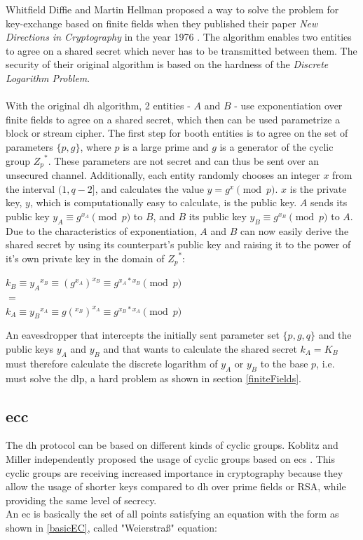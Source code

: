 Whitfield Diffie and Martin Hellman proposed a way to solve the problem for key-exchange based on finite fields
when they published their paper \textit{New Directions in Cryptography} in the year 1976 \cite{1055638}. The algorithm enables two entities to agree on a 
shared secret which never has to be transmitted between them. The security of their original algorithm
is based on the hardness of the \textit{Discrete Logarithm Problem}.
\\
\\
With the original \gls{dh} algorithm, 2 entities - $A$ and $B$ - use exponentiation over finite fields to agree on a shared secret, which
then can be used parametrize a block or stream cipher. The first step for booth entities is to agree on the set of parameters $\{p, g\}$, where $p$ is a 
large prime and $g$ is a generator of the cyclic group ${Z_p}^*$. These parameters are not secret and
can thus be sent over an unsecured channel.
Additionally, each entity randomly chooses an integer $x$ from the interval $(1, q-2]$, and calculates the value $y = g^x \pmod p$. $x$ is the private key,
$y$, which is computationally easy to calculate, is the public key. $A$ sends its public key $y_A \equiv g^{x_A} \pmod p$ to $B$, and $B$ its public key
$y_B \equiv g^{x_B} \pmod p$ to $A$. Due to the characteristics of exponentiation, $A$ and $B$ can now easily derive the shared secret by using its counterpart's
public key and raising it to the power of it's own private key in the domain of ${Z_p}^*$:

\begin{center}
 $k_B \equiv {y_A}^{x_B} \equiv (g^{x_A})^{x_B} \equiv g^{x_A*x_B} \pmod p $\\
 $ = $ \\
 $ k_A \equiv {y_B}^{x_A} \equiv g(^{x_B})^{x_A} \equiv g^{x_B*x_A} \pmod p $
\end{center}
An eavesdropper that intercepts the initially sent parameter set $\{p, g, q\}$ and the public keys $y_A$ and $y_B$ and that wants to calculate the shared secret
$k_A = K_B$  must therefore calculate the discrete logarithm of $y_A$ or $y_B$ to the base $p$, i.e. must solve the \gls{dlp}, a hard problem as shown in
section \ref{finiteFields}.
\\

\subsection{\gls{ecc}}

The \gls{dh} protocol can be based on different kinds of cyclic groups. Koblitz and Miller independently proposed the usage of cyclic groups based on
\glspl{ec} \cite{eccKoblitz} \cite{eccMiller}.
This cyclic groups are receiving increased importance in cryptography because they allow the usage
of shorter keys compared to \gls{dh} over prime fields or RSA, while providing the same level of secrecy.
\\
An \gls{ec} is basically the set of all points
satisfying an equation with the form as shown in \ref{basicEC}, called "Weierstraß" equation:

